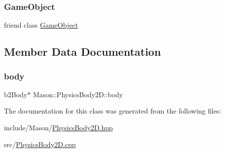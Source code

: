\subsubsection{\texorpdfstring{Game\+Object}{GameObject}}
{\footnotesize\ttfamily friend class \hyperlink{class_mason_1_1_game_object}{Game\+Object}\hspace{0.3cm}{\ttfamily [friend]}}



\subsection{Member Data Documentation}
\hypertarget{class_mason_1_1_physics_body2_d_abd02e269a86d5b760966a33eefa918d9}{}\label{class_mason_1_1_physics_body2_d_abd02e269a86d5b760966a33eefa918d9} 
\subsubsection{\texorpdfstring{body}{body}}
{\footnotesize\ttfamily b2\+Body$\ast$ Mason\+::\+Physics\+Body2\+D\+::body}



The documentation for this class was generated from the following files\+:\begin{DoxyCompactItemize}
\item 
include/\+Mason/\hyperlink{_physics_body2_d_8hpp}{Physics\+Body2\+D.\+hpp}\item 
src/\hyperlink{_physics_body2_d_8cpp}{Physics\+Body2\+D.\+cpp}\end{DoxyCompactItemize}
